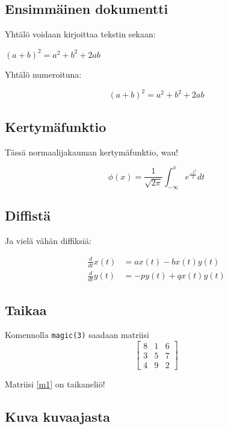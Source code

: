 \documentclass[a4paper,11pt]{article}
\begin{document}
{\subsection{Ensimmäinen dokumentti}

Yhtälö voidaan kirjoittaa tekstin sekaan:

$(a+b)^2 = a^2 + b^2 + 2ab$

Yhtälö numeroituna:

\begin{equation}
    (a+b)^2 = a^2 + b^2 + 2ab
\end{equation}

\subsection{Kertymäfunktio}

Tässä normaalijakauman kertymäfunktio, wau!

\begin{equation}
    \phi(x) = \frac{1}{\sqrt{2\pi}} \int_{-\infty}^{x} e^{\frac{-t^2}{2}} dt
\end{equation}

\subsection{Diffistä}

Ja vielä vähän diffiksiä:

\begin{align}
    \frac{d}{dt}x(t) & = ax(t) - bx(t)y(t) \\
    \frac{d}{dt}y(t) & = -py(t) + qx(t)y(t)
\end{align}

\subsection{Taikaa}

Komennolla \texttt{magic(3)} saadaan matriisi
\begin{equation}
\label{m1}
\begin{bmatrix}
8 & 1 & 6\\
3 & 5 & 7\\
4 & 9 & 2
\end{bmatrix}   
\end{equation}

Matriisi \eqref{m1} on taikaneliö!

\subsection{Kuva kuvaajasta}

}
\end{document}

